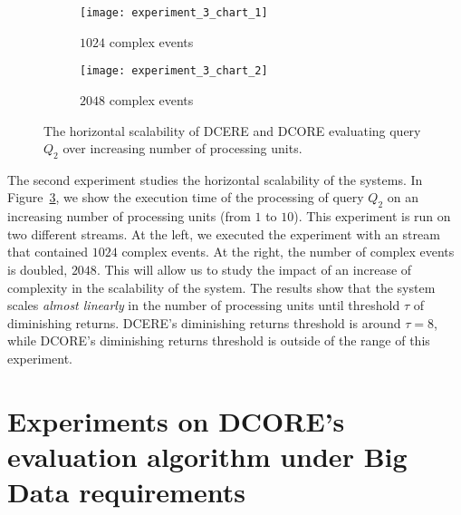 \begin{figure}[H]
     \begin{adjustbox}{max width=1.2\linewidth,center}
     \centering
     \begin{subfigure}[b]{0.7\textwidth}
         \centering
         \texttt{[image: experiment\_3\_chart\_1]}
         \caption{$1024$ complex events}
         \label{fig:experiment:3:subfigure:1}
     \end{subfigure}
     \begin{subfigure}[b]{0.7\textwidth}
         \centering
         \texttt{[image: experiment\_3\_chart\_2]}
         \caption{$2048$ complex events}
         \label{fig:experiment:3:subfigure:1}
     \end{subfigure}
     \end{adjustbox}
     \caption{???}
     \caption{The horizontal scalability of DCERE and DCORE evaluating query $Q_{2}$ over increasing number of processing units.}
     \label{fig:experiment:3}
\end{figure}

The second experiment studies the horizontal scalability of the systems. In Figure~\ref{fig:experiment:3}, we show the execution time of the processing of query $Q_{2}$ on an increasing number of processing units (from $1$ to $10$). This experiment is run on two different streams. At the left, we executed the experiment with an stream that contained $1024$ complex events. At the right, the number of complex events is doubled, $2048$. This will allow us to study the impact of an increase of complexity in the scalability of the system. The results show that the system scales \emph{almost linearly} in the number of processing units until threshold $\tau$ of diminishing returns. DCERE's diminishing returns threshold is around $\tau = 8$, while DCORE's diminishing returns threshold is outside of the range of this experiment.

\section{Experiments on DCORE's evaluation algorithm under Big Data requirements}\label{sec:new-algorithm}

